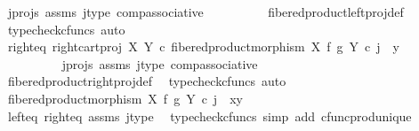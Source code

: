 \begin{isabellebody}
\ j{\isacharunderscore}{\kern0pt}projs\ assms\ j{\isacharunderscore}{\kern0pt}type\ comp{\isacharunderscore}{\kern0pt}associative{}\isanewline
\ \ \ \ \ \ \ \ \isamarkupfalse%
\ fibered{\isacharunderscore}{\kern0pt}product{\isacharunderscore}{\kern0pt}left{\isacharunderscore}{\kern0pt}proj{\isacharunderscore}{\kern0pt}def\ \isamarkupfalse%
\ {\isacharparenleft}{\kern0pt}typecheck{\isacharunderscore}{\kern0pt}cfuncs{\isacharcomma}{\kern0pt}\ auto{\isacharparenright}{\kern0pt}\isanewline
\isanewline
\ \ \ \ \ \ \isamarkupfalse%
\ right{\isacharunderscore}{\kern0pt}eq{\isacharcolon}{\kern0pt}\ {\isachardoublequoteopen}right{\isacharunderscore}{\kern0pt}cart{\isacharunderscore}{\kern0pt}proj\ X\ Y\ {\isasymcirc}\isactrlsub c\ fibered{\isacharunderscore}{\kern0pt}product{\isacharunderscore}{\kern0pt}morphism\ X\ f\ g\ Y\ {\isasymcirc}\isactrlsub c\ j\ {\isacharequal}{\kern0pt}\ y{\isachardoublequoteclose}\isanewline
\ \ \ \ \ \ \ \ \isamarkupfalse%
\ j{\isacharunderscore}{\kern0pt}projs\ assms\ j{\isacharunderscore}{\kern0pt}type\ comp{\isacharunderscore}{\kern0pt}associative{}\isanewline
\ \ \ \ \ \ \ \ \isamarkupfalse%
\ fibered{\isacharunderscore}{\kern0pt}product{\isacharunderscore}{\kern0pt}right{\isacharunderscore}{\kern0pt}proj{\isacharunderscore}{\kern0pt}def\ \isamarkupfalse%
\ {\isacharparenleft}{\kern0pt}typecheck{\isacharunderscore}{\kern0pt}cfuncs{\isacharcomma}{\kern0pt}\ auto{\isacharparenright}{\kern0pt}\isanewline
\isanewline
\ \ \ \ \ \ \isamarkupfalse%
\ {\isachardoublequoteopen}fibered{\isacharunderscore}{\kern0pt}product{\isacharunderscore}{\kern0pt}morphism\ X\ f\ g\ Y\ {\isasymcirc}\isactrlsub c\ j\ {\isacharequal}{\kern0pt}\ {\isasymlangle}x{\isacharcomma}{\kern0pt}y{\isasymrangle}{\isachardoublequoteclose}\isanewline
\ \ \ \ \ \ \ \ \isamarkupfalse%
\ left{\isacharunderscore}{\kern0pt}eq\ right{\isacharunderscore}{\kern0pt}eq\ assms\ j{\isacharunderscore}{\kern0pt}type\ \isamarkupfalse%
\ {\isacharparenleft}{\kern0pt}typecheck{\isacharunderscore}{\kern0pt}cfuncs{\isacharcomma}{\kern0pt}\ simp\ add{\isacharcolon}{\kern0pt}\ cfunc{\isacharunderscore}{\kern0pt}prod{\isacharunderscore}{\kern0pt}unique{\isacharparenright}{\kern0pt}\isanewline
\ \ \ \ \isamarkupfalse%
\isanewline
\ \ \isamarkupfalse%
\isanewline
{}\isamarkupfalse%
%
\endisatagproof
{\isafoldproof}%
%
\isadelimproof
\isanewline
%
\endisadelimproof
\isanewline

\end{isabellebody}
